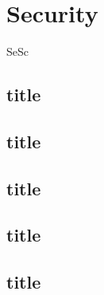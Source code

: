 \chapter{Security}
\begin{tiny}
	SeSc
\end{tiny}

\section{title}


\section{title}



\section{title}



\section{title}



\section{title}